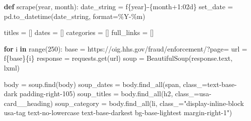 \documentclass[
  letterpaper,
  DIV=11,
  numbers=noendperiod]{scrartcl}
\newenvironment{Shaded}{\begin{snugshade}}{\end{snugshade}}
\newcommand{\BuiltInTok}[1]{\textcolor[rgb]{0.00,0.23,0.31}{#1}}
\newcommand{\ControlFlowTok}[1]{\textcolor[rgb]{0.00,0.23,0.31}{\textbf{#1}}}
\newcommand{\DecValTok}[1]{\textcolor[rgb]{0.68,0.00,0.00}{#1}}
\newcommand{\KeywordTok}[1]{\textcolor[rgb]{0.00,0.23,0.31}{\textbf{#1}}}
\newcommand{\NormalTok}[1]{\textcolor[rgb]{0.00,0.23,0.31}{#1}}
\newcommand{\OperatorTok}[1]{\textcolor[rgb]{0.37,0.37,0.37}{#1}}
\newcommand{\SpecialCharTok}[1]{\textcolor[rgb]{0.37,0.37,0.37}{#1}}
\newcommand{\SpecialStringTok}[1]{\textcolor[rgb]{0.13,0.47,0.30}{#1}}
\newcommand{\StringTok}[1]{\textcolor[rgb]{0.13,0.47,0.30}{#1}}
\begin{document}
\begin{Shaded}
\begin{Highlighting}[]
\KeywordTok{def}\NormalTok{ scrape(year, month):}
\NormalTok{    date\_string }\OperatorTok{=} \SpecialStringTok{f\textquotesingle{}}\SpecialCharTok{\{}\NormalTok{year}\SpecialCharTok{\}}\SpecialStringTok{{-}}\SpecialCharTok{\{}\NormalTok{month}\OperatorTok{+}\DecValTok{1}\SpecialCharTok{:02d\}}\SpecialStringTok{\textquotesingle{}}
\NormalTok{    set\_date }\OperatorTok{=}\NormalTok{ pd.to\_datetime(date\_string, }\BuiltInTok{format}\OperatorTok{=}\StringTok{\textquotesingle{}\%Y{-}\%m\textquotesingle{}}\NormalTok{)}

\NormalTok{    titles }\OperatorTok{=}\NormalTok{ []}
\NormalTok{    dates }\OperatorTok{=}\NormalTok{ []}
\NormalTok{    categories }\OperatorTok{=}\NormalTok{ []}
\NormalTok{    full\_links }\OperatorTok{=}\NormalTok{ []}

    \ControlFlowTok{for}\NormalTok{ i }\KeywordTok{in} \BuiltInTok{range}\NormalTok{(}\DecValTok{250}\NormalTok{):}
\NormalTok{        base }\OperatorTok{=} \StringTok{\textquotesingle{}https://oig.hhs.gov/fraud/enforcement/?page=\textquotesingle{}}
\NormalTok{        url }\OperatorTok{=} \SpecialStringTok{f\textquotesingle{}}\SpecialCharTok{\{}\NormalTok{base}\SpecialCharTok{\}\{}\NormalTok{i}\SpecialCharTok{\}}\SpecialStringTok{\textquotesingle{}}
\NormalTok{        response }\OperatorTok{=}\NormalTok{ requests.get(url)}
\NormalTok{        soup }\OperatorTok{=}\NormalTok{ BeautifulSoup(response.text, }\StringTok{\textquotesingle{}lxml\textquotesingle{}}\NormalTok{)}

\NormalTok{        body }\OperatorTok{=}\NormalTok{ soup.find(}\StringTok{\textquotesingle{}body\textquotesingle{}}\NormalTok{)}
\NormalTok{        soup\_dates }\OperatorTok{=}\NormalTok{ body.find\_all(}\StringTok{\textquotesingle{}span\textquotesingle{}}\NormalTok{, class\_}\OperatorTok{=}\StringTok{\textquotesingle{}text{-}base{-}dark padding{-}right{-}105\textquotesingle{}}\NormalTok{)}
\NormalTok{        soup\_titles }\OperatorTok{=}\NormalTok{ body.find\_all(}\StringTok{\textquotesingle{}h2\textquotesingle{}}\NormalTok{, class\_}\OperatorTok{=}\StringTok{\textquotesingle{}usa{-}card\_\_heading\textquotesingle{}}\NormalTok{)}
\NormalTok{        soup\_category }\OperatorTok{=}\NormalTok{ body.find\_all(}\StringTok{\textquotesingle{}li\textquotesingle{}}\NormalTok{, class\_}\OperatorTok{=}\StringTok{"display{-}inline{-}block usa{-}tag text{-}no{-}lowercase text{-}base{-}darkest bg{-}base{-}lightest margin{-}right{-}1"}\NormalTok{)}


\end{Highlighting}
\end{Shaded}
\end{document}
